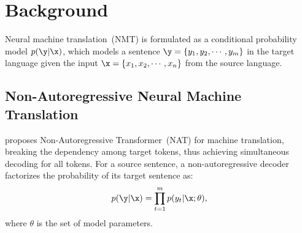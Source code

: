 \section{Background}\label{sec:background}
Neural machine translation~(NMT) is formulated as a conditional probability model $p(\y|\x)$, which models a sentence $\y = \{y_1,y_2,\cdots,y_m\}$ in the target language given the input $\x = \{x_1,x_2,\cdots,x_n\}$ from the source language.



\subsection{Non-Autoregressive Neural Machine Translation}\label{ss:non-auto}
\citet{nat} proposes Non-Autoregressive Transformer~(NAT) for machine translation, breaking the dependency among target tokens, thus achieving simultaneous decoding for all tokens. 
For a source sentence, a non-autoregressive decoder factorizes the probability of its target sentence as:
\begin{equation}
    p(\y|\x)= \prod_{t=1}^{m}p(y_{t}|\x; \theta),
    \label{eqn:nat}
\end{equation}
where $\theta$ is the set of model parameters.

